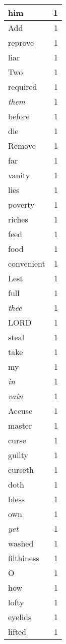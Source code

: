 \begin{center}
\begin{longtable}{l|r}
him & 1\\ \hline 
Add & 1\\ \hline 
reprove & 1\\ \hline 
liar & 1\\ \hline 
Two & 1\\ \hline 
required & 1\\ \hline 
\emph{them} & 1\\ \hline 
before & 1\\ \hline 
die & 1\\ \hline 
Remove & 1\\ \hline 
far & 1\\ \hline 
vanity & 1\\ \hline 
lies & 1\\ \hline 
poverty & 1\\ \hline 
riches & 1\\ \hline 
feed & 1\\ \hline 
food & 1\\ \hline 
convenient & 1\\ \hline 
Lest & 1\\ \hline 
full & 1\\ \hline 
\emph{thee} & 1\\ \hline 
LORD & 1\\ \hline 
steal & 1\\ \hline 
take & 1\\ \hline 
my & 1\\ \hline 
\emph{in} & 1\\ \hline 
\emph{vain} & 1\\ \hline 
Accuse & 1\\ \hline 
master & 1\\ \hline 
curse & 1\\ \hline 
guilty & 1\\ \hline 
curseth & 1\\ \hline 
doth & 1\\ \hline 
bless & 1\\ \hline 
own & 1\\ \hline 
\emph{yet} & 1\\ \hline 
washed & 1\\ \hline 
filthiness & 1\\ \hline 
O & 1\\ \hline 
how & 1\\ \hline 
lofty & 1\\ \hline 
eyelids & 1\\ \hline 
lifted & 1\\ \hline 

\end{longtable}
\end{center}
